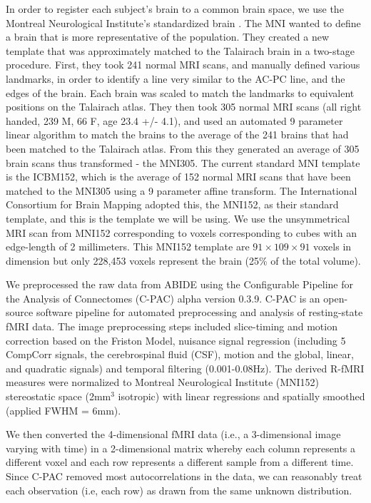 {In order to register each subject's brain to a common brain space, we
use the Montreal Neurological Institute's standardized brain
\cite{evans19933d,collins1994automatic}.
The MNI wanted to define a brain that is more representative of the
population. They created a new template that was approximately matched
to the Talairach brain in a two-stage procedure. First, they took 241
normal MRI scans, and manually defined various landmarks, in order to
identify a line very similar to the AC-PC line, and the edges of the
brain. Each brain was scaled to match the landmarks to equivalent
positions on the Talairach atlas. They then took 305 normal MRI scans
(all right handed, 239 M, 66 F, age 23.4 +/- 4.1), and used an
automated 9 parameter linear algorithm to match the brains to the
average of the 241 brains that had been matched to the Talairach atlas.
From this they generated an average of 305 brain scans thus transformed
- the MNI305. The current standard MNI template is the ICBM152, which
is the average of 152 normal MRI scans  that have been matched to the
MNI305 using a 9 parameter affine transform. The International
Consortium for Brain Mapping adopted this, the MNI152, as their
standard template, and this is the template we will be using. We use
the unsymmetrical MRI scan from MNI152 corresponding to voxels
corresponding to cubes with an edge-length of 2 millimeters. This
MNI152 template are $91\times 109 \times 91$ voxels in dimension but
only 228,453 voxels represent the brain (25\% of the total volume).

We preprocessed the raw data from ABIDE using the Configurable Pipeline
for the Analysis of Connectomes (C-PAC) alpha version 0.3.9. C-PAC is
an open-source software pipeline for automated preprocessing and
analysis of resting-state fMRI data. The image preprocessing steps
included slice-timing and motion correction based on the Friston Model,
nuisance signal regression (including 5 CompCorr signals, the
cerebrospinal fluid (CSF), motion and the global, linear, and quadratic
signals) and temporal filtering (0.001-0.08Hz). The derived R-fMRI
measures were normalized to Montreal Neurological Institute (MNI152)
stereostatic space (2mm$^3$ isotropic) with linear regressions and
spatially smoothed (applied FWHM = 6mm).

We then converted the 4-dimensional fMRI data (i.e., a 3-dimensional
image varying with time) in a 2-dimensional matrix whereby each column
represents a different voxel and each row represents a different sample
from a different time. Since C-PAC removed most autocorrelations in the
data, we can reasonably treat each observation (i.e, each row) as drawn
from the same unknown distribution.
}

